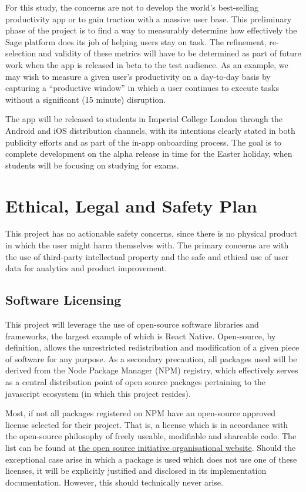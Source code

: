 For this study, the concerns are not to develop the world's best-selling productivity app or to gain traction with a massive user base. This preliminary phase of the project is to find a way to measurably determine how effectively the Sage platform does its job of helping users stay on task. The refinement, re-selection and validity of these metrics will have to be determined as part of future work when the app is released in beta to the test audience. As an example, we may wish to measure a given user's productivity on a day-to-day basis by capturing a ``productive window'' in which a user continues to execute tasks without a significant (15 minute) disruption.

The app will be released to students in Imperial College London through the Android and iOS distribution channels, with its intentions clearly stated in both publicity efforts and as part of the in-app onboarding process. The goal is to complete development on the alpha release in time for the Easter holiday, when students will be focusing on studying for exams.

\section{Ethical, Legal and Safety Plan}
This project has no actionable safety concerns, since there is no physical product in which the user might harm themselves with. The primary concerns are with the use of third-party intellectual property and the safe and ethical use of user data for analytics and product improvement.

\subsection{Software Licensing}
This project will leverage the use of open-source software libraries and frameworks, the largest example of which is React Native. Open-source, by definition, allows the unrestricted redistribution and modification of a given piece of software for any purpose. As a secondary precaution, all packages used will be derived from the Node Package Manager (NPM) registry, which effectively serves as a central distribution point of open source packages pertaining to the javascript ecosystem (in which this project resides).

Most, if not all packages registered on NPM have an open-source approved license selected for their project. That is, a license which is in accordance with the open-source philosophy of freely useable, modifiable and shareable code. The list can be found at \href{https://opensource.org/licenses}{the open source initiative organisational website}. Should the exceptional case arise in which a package is used which does not use one of these licenses, it will be explicitly justified and disclosed in its implementation documentation. However, this should technically never arise.


